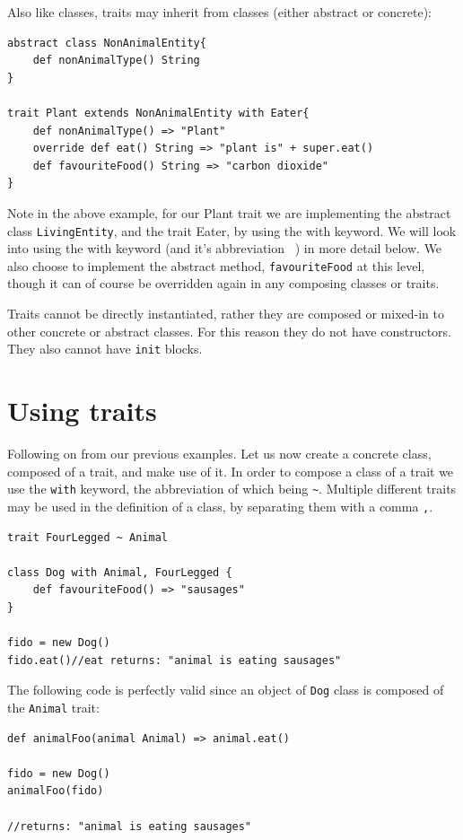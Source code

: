 \documentclass[conc-doc]{subfiles}
\begin{document}
Also like classes, traits may inherit from classes (either abstract or concrete):

\begin{lstlisting}
abstract class NonAnimalEntity{
	def nonAnimalType() String
}

trait Plant extends NonAnimalEntity with Eater{
	def nonAnimalType() => "Plant"
	override def eat() String => "plant is" + super.eat()
	def favouriteFood() String => "carbon dioxide"
}
\end{lstlisting}

Note in the above example, for our Plant trait we are implementing the abstract class \lstinline{LivingEntity}, and the trait Eater, by using the with keyword. We will look into using the with keyword (and it's abbreviation ~) in more detail below. We also choose to implement the abstract method, \lstinline{favouriteFood} at this level, though it can of course be overridden again in any composing classes or traits.

Traits cannot be directly instantiated, rather they are composed or mixed-in to other concrete or abstract classes. For this reason they do not have constructors. They also cannot have \lstinline{init} blocks.

\section{Using traits}
Following on from our previous examples. Let us now create a concrete class, composed of a trait, and make use of it. In order to compose a class of a trait we use the \lstinline{with} keyword, the abbreviation of which being \lstinline{~}. Multiple different traits may be used in the definition of a class, by separating them with a comma \lstinline{,}.

\begin{lstlisting}
trait FourLegged ~ Animal

class Dog with Animal, FourLegged {
	def favouriteFood() => "sausages"
}

fido = new Dog()
fido.eat()//eat returns: "animal is eating sausages"
\end{lstlisting}

The following code is perfectly valid since an object of \lstinline{Dog} class is composed of the \lstinline{Animal} trait:
\begin{lstlisting}
def animalFoo(animal Animal) => animal.eat()

fido = new Dog()
animalFoo(fido)

//returns: "animal is eating sausages"
\end{lstlisting}
\end{document}
